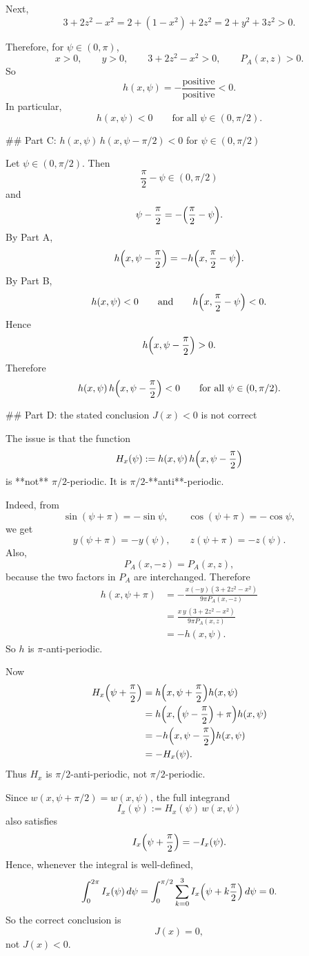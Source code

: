 Next,
\[
3+2z^2-x^2
=2+(1-x^2)+2z^2
=2+y^2+3z^2>0.
\]

Therefore, for \(\psi\in(0,\pi)\),
\[
x>0,\qquad y>0,\qquad 3+2z^2-x^2>0,\qquad P_A(x,z)>0.
\]
So
\[
h(x,\psi)= -\frac{\text{positive}}{\text{positive}}<0.
\]
In particular,
\[
h(x,\psi)<0\qquad\text{for all }\psi\in(0,\pi/2).
\]

## Part C: \(h(x,\psi)\,h(x,\psi-\pi/2)<0\) for \(\psi\in(0,\pi/2)\)

Let \(\psi\in(0,\pi/2)\). Then
\[
\frac{\pi}{2}-\psi\in(0,\pi/2)
\]
and
\[
\psi-\frac{\pi}{2}=-\Bigl(\frac{\pi}{2}-\psi\Bigr).
\]
By Part A,
\[
h\Bigl(x,\psi-\frac{\pi}{2}\Bigr)
=-h\Bigl(x,\frac{\pi}{2}-\psi\Bigr).
\]
By Part B,
\[
h(x,\psi)<0
\qquad\text{and}\qquad
h\Bigl(x,\frac{\pi}{2}-\psi\Bigr)<0.
\]
Hence
\[
h\Bigl(x,\psi-\frac{\pi}{2}\Bigr)>0.
\]
Therefore
\[
h(x,\psi)\,h\Bigl(x,\psi-\frac{\pi}{2}\Bigr)<0
\qquad\text{for all }\psi\in(0,\pi/2).
\]

## Part D: the stated conclusion \(J(x)<0\) is not correct

The issue is that the function
\[
H_x(\psi):=h(x,\psi)\,h\Bigl(x,\psi-\frac{\pi}{2}\Bigr)
\]
is **not** \(\pi/2\)-periodic. It is \(\pi/2\)-**anti**-periodic.

Indeed, from
\[
\sin(\psi+\pi)=-\sin\psi,\qquad \cos(\psi+\pi)=-\cos\psi,
\]
we get
\[
y(\psi+\pi)=-y(\psi),\qquad z(\psi+\pi)=-z(\psi).
\]
Also,
\[
P_A(x,-z)=P_A(x,z),
\]
because the two factors in \(P_A\) are interchanged. Therefore
\[
\begin{aligned}
h(x,\psi+\pi)
&=-\frac{x(-y)(3+2z^2-x^2)}{9\pi P_A(x,-z)}\\
&=\frac{x\,y\,(3+2z^2-x^2)}{9\pi P_A(x,z)}\\
&=-h(x,\psi).
\end{aligned}
\]
So \(h\) is \(\pi\)-anti-periodic.

Now
\[
\begin{aligned}
H_x\Bigl(\psi+\frac{\pi}{2}\Bigr)
&=h\Bigl(x,\psi+\frac{\pi}{2}\Bigr)h(x,\psi)\\
&=h\Bigl(x,\Bigl(\psi-\frac{\pi}{2}\Bigr)+\pi\Bigr)h(x,\psi)\\
&=-h\Bigl(x,\psi-\frac{\pi}{2}\Bigr)h(x,\psi)\\
&=-H_x(\psi).
\end{aligned}
\]
Thus \(H_x\) is \(\pi/2\)-anti-periodic, not \(\pi/2\)-periodic.

Since \(w(x,\psi+\pi/2)=w(x,\psi)\), the full integrand
\[
I_x(\psi):=H_x(\psi)\,w(x,\psi)
\]
also satisfies
\[
I_x\Bigl(\psi+\frac{\pi}{2}\Bigr)=-I_x(\psi).
\]
Hence, whenever the integral is well-defined,
\[
\int_0^{2\pi} I_x(\psi)\,d\psi
=\int_0^{\pi/2}\sum_{k=0}^3 I_x\Bigl(\psi+k\frac{\pi}{2}\Bigr)\,d\psi
=0.
\]
So the correct conclusion is
\[
J(x)=0,
\]
not \(J(x)<0\).

